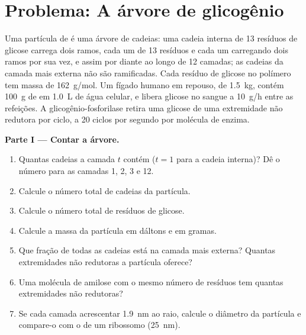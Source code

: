 \section{Problema: A árvore de glicogênio}

\begin{problem}
\label{pb:b1:carbohydrates:1}
Uma partícula de  é uma árvore de cadeias: uma cadeia interna
de \qty{13}{} resíduos de glicose carrega dois ramos, cada um de
\qty{13}{} resíduos e cada um carregando dois ramos por sua vez, e assim
por diante ao longo de \qty{12}{} camadas; as cadeias da camada mais
externa não são ramificadas. Cada resíduo de glicose no polímero tem
massa de \qty{162}{g/mol}. Um fígado humano em repouso, de
\qty{1.5}{kg}, contém \qty{100}{g} de  em \qty{1.0}{L} de água
celular, e libera glicose no sangue a \qty{10}{g/h} entre as refeições.
A glicogênio-fosforilase retira uma glicose de uma extremidade não
redutora por ciclo, a \qty{20}{} ciclos por segundo por molécula de
enzima.

\medskip
\noindent\textbf{Parte I --- Contar a árvore.}
\begin{enumerate}
  \item Quantas cadeias a camada $t$ contém ($t = 1$ para a cadeia
        interna)? Dê o número para as camadas 1, 2, 3 e 12.
  \item Calcule o número total de cadeias da partícula.
  \item Calcule o número total de resíduos de glicose.
  \item Calcule a massa da partícula em dáltons e em gramas.
  \item Que fração de todas as cadeias está na camada mais externa?
        Quantas extremidades não redutoras a partícula oferece?
  \item Uma molécula de amilose com o mesmo número de resíduos tem
        quantas extremidades não redutoras?
  \item Se cada camada acrescentar \qty{1.9}{nm} ao raio, calcule o
        diâmetro da partícula e compare-o com o de um ribossomo
        (\qty{25}{nm}).
\end{enumerate}


\end{problem}
